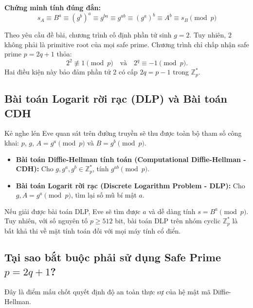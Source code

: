 \documentclass[12pt,a4paper]{article}
\theoremstyle{plain}
\begin{document}
\textbf{Chứng minh tính đúng đắn:}
\begin{equation}
s_A \equiv B^a \equiv (g^b)^a \equiv g^{ba} \equiv g^{ab} \equiv (g^a)^b \equiv A^b \equiv s_B \pmod p
\end{equation}

Theo yêu cầu đề bài, chương trình cố định phần tử sinh $g = 2$. Tuy nhiên, $2$ không phải là primitive root của mọi safe prime. Chương trình chỉ chấp nhận safe prime $p=2q+1$ thỏa:
\[
2^2 \not\equiv 1 \pmod p
\quad\text{và}\quad
2^q \equiv -1 \pmod p.
\]
Hai điều kiện này bảo đảm phần tử $2$ có cấp $2q=p-1$ trong $\mathbb{Z}_p^*$.

\subsection{Bài toán Logarit rời rạc (DLP) và Bài toán CDH}
Kẻ nghe lén Eve quan sát trên đường truyền sẽ thu được toàn bộ tham số công khai: $p$, $g$, $A = g^a \pmod p$ và $B = g^b \pmod p$.
\begin{itemize}
    \item \textbf{Bài toán Diffie-Hellman tính toán (Computational Diffie-Hellman - CDH):} Cho $g, g^a, g^b \in \mathbb{Z}_p^*$, tính $g^{ab} \pmod p$.
    \item \textbf{Bài toán Logarit rời rạc (Discrete Logarithm Problem - DLP):} Cho $g, A = g^a \pmod p$, tìm lại số mũ bí mật $a$.
\end{itemize}
Nếu giải được bài toán DLP, Eve sẽ tìm được $a$ và dễ dàng tính $s = B^a \pmod p$. Tuy nhiên, với số nguyên tố $p \ge 512$ bit, bài toán DLP trên nhóm cyclic $\mathbb{Z}_p^*$ là bất khả thi về mặt tính toán đối với mọi máy tính cổ điển.

\subsection{Tại sao bắt buộc phải sử dụng Safe Prime $p = 2q + 1$?}
Đây là điểm mấu chốt quyết định độ an toàn thực sự của hệ mật mã Diffie-Hellman.
\end{document}

